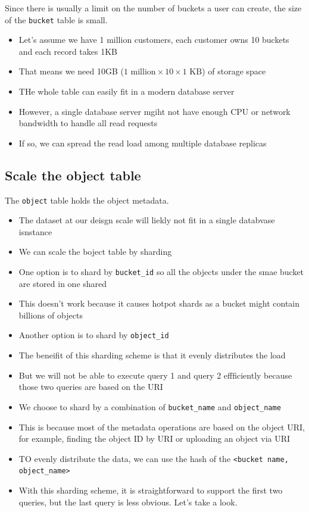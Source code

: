 \documentclass{report}
\theoremstyle{definition}
\let\oldsubsection\subsection
\renewcommand{\subsection}{\oldsubsection*}
\begin{document}
Since there is usually a limit on the number of buckets a user can create, the size of the \lstinline|bucket| table is small.

\begin{itemize}
\item
Let's assume we have 1 million customers, each customer owns 10 buckets and each record takes 1KB
\item
That means we need 10GB ($1 \text{ million} \times 10 \times 1 \text{ KB}$) of storage space
\item
THe whole table can easily fit in a modern database server
\item
However, a single database server mgiht not have enough CPU or network bandwidth to handle all read requests
\item
If so, we can spread the read load among multiple database replicas
\end{itemize}

\subsection{Scale the object table}

The \lstinline|object| table holds the object metadata.

\begin{itemize}
\item
The dataset at our deisgn scale will liekly not fit in a single databvase isnstance
\item
We can scale the boject table by sharding
\item
One option is to shard by \lstinline|bucket_id| so all the objects under the smae bucket are stored in one shared
\item
This doesn't work because it causes hotpot shards as a bucket might contain billions of objects
\item
Another option is to shard by \lstinline|object_id|
\item
The beneifit of this sharding scheme is that it evenly distributes the load
\item
But we will not be able to execute query 1 and query 2 effficiently because those two queries are based on the URI
\item
We choose to shard by a combination of \lstinline|bucket_name| and \lstinline|object_name|
\item
This is because most of the metadata operations are based on the object URI, for example, finding the object ID by URI or uploading an object via URI
\item
TO evenly distribute the data, we can use the hash of the \lstinline|<bucket name, object_name>|
\item
With this sharding scheme, it is straightforward to support the first two queries, but the last query is less obvious. Let's take a look.
\end{itemize}
\end{document}
